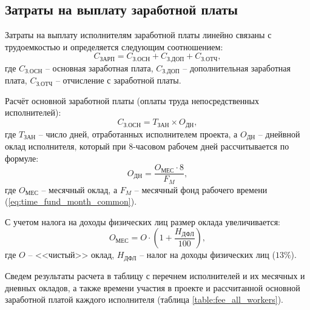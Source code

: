 \subsection{Затраты на выплату заработной платы} \label{salary}

Затраты на выплату исполнителям заработной платы линейно связаны с трудоемкостью и определяется следующим соотношением:
\begin{equation}
  \label{eq:salary}
C_\textrm{ЗАРП} = C_\textrm{З.ОСН} + C_\textrm{З.ДОП} + C_\textrm{З.ОТЧ},
\end{equation}
где $C_\textrm{З.ОСН}$ -- основная заработная плата, $C_\textrm{З.ДОП}$ -- дополнительная заработная плата, $C_\textrm{З.ОТЧ}$ -- отчисление с заработной платы.

\vspace{\baselineskip}
Расчёт основной заработной платы (оплаты труда непосредственных исполнителей):
\begin{equation}
  \label{eq:salary_counting}
C_\textrm{З.ОСН} = T_\textrm{ЗАН} \times O_\textrm{ДН},
\end{equation}
где $T_\textrm{ЗАН}$ -- число дней, отработанных исполнителем проекта, а $O_\textrm{ДН}$ -- днейвной оклад исполнителя, который при 8-часовом рабочем дней рассчитывается по формуле:
\begin{equation}
  \label{eq:worker_fee}
O_\textrm{ДН} = \frac {O_\textrm{МЕС} \cdot 8} {F_M},
\end{equation}
где $O_\textrm{МЕС}$ -- месячный оклад, а $F_M$ -- месячный фонд рабочего времени (\ref{eq:time_fund_month_common}).

\vspace{\baselineskip}
С учетом налога на доходы физических лиц размер оклада увеличивается:
\begin{equation}
  \label{eq:worker_fee_with_taxes}
O_\textrm{МЕС} = O \cdot (1 + \frac {H_\textrm{ДФЛ}} {100}),
\end{equation}
где $O$ -- <<чистый>> оклад, $H_\textrm{ДФЛ}$ -- налог на доходы физических лиц ($13\%$).

\vspace{\baselineskip}
Сведем результаты расчета в таблицу с перечнем исполнителей и их месячных и дневных окладов, а также времени участия в проекте и рассчитанной основной заработной платой каждого исполнителя (таблица \ref{table:fee_all_workers}).

